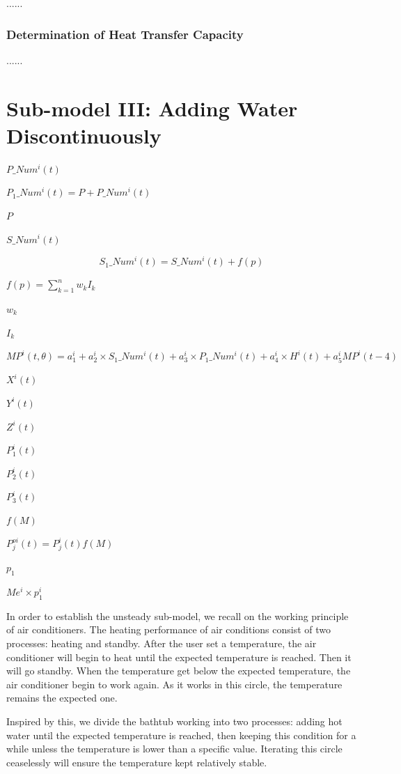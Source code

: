 \documentclass{mcmthesis}
\begin{document}
......

\subsubsection{Determination of Heat Transfer Capacity}

......

\section{Sub-model III: Adding Water Discontinuously}
$P\_Num^{i}(t)$

$P_{1}\_Num^{i}(t) = P+P\_Num^{i}(t)$

$P$

$S\_Num^{i}(t)$

\begin{equation}
S_{1}\_Num^{i}(t) = S\_Num^{i}(t) + f(p)
\end{equation}

$f(p) = \sum_{k=1}^{n}w_{k}I_{k}$

$w_{k}$

$I_{k}$

$MP^{i}(t, \theta) = a_{1}^{i}+a_{2}^{i}\times S_{1}\_Num^{i}(t) + a_{3}^{i}\times P_{1}\_Num^{i}(t) + a_{4}^{i}\times H^{i}(t) + a_{5}^{i}MP^{i}(t-4)$

$X^{i}(t)$

$Y^{i}(t)$

$Z^{i}(t)$

$P_{1}^{i}(t)$

$P_{2}^{i}(t)$

$P_{3}^{i}(t)$

$f(M)$

$P_{j}^{oi}(t) = P_{j}^{i}(t)f(M)$

$p_{1}$

$Me^{i}\times p_{1}^{i}$

In order to establish the unsteady sub-model, we recall on the working principle of air conditioners. The heating performance of air conditions consist of two processes: heating and standby. After the user set a temperature, the air conditioner will begin to heat until the expected temperature is reached. Then it will go standby. When the temperature get below the expected temperature, the air conditioner begin to work again. As it works in this circle, the temperature remains the expected one.

Inspired by this, we divide the bathtub working into two processes: adding
hot water until the expected temperature is reached, then keeping this
condition for a while unless the temperature is lower than a specific value. Iterating this circle ceaselessly will ensure the temperature kept relatively stable.
\end{document}
